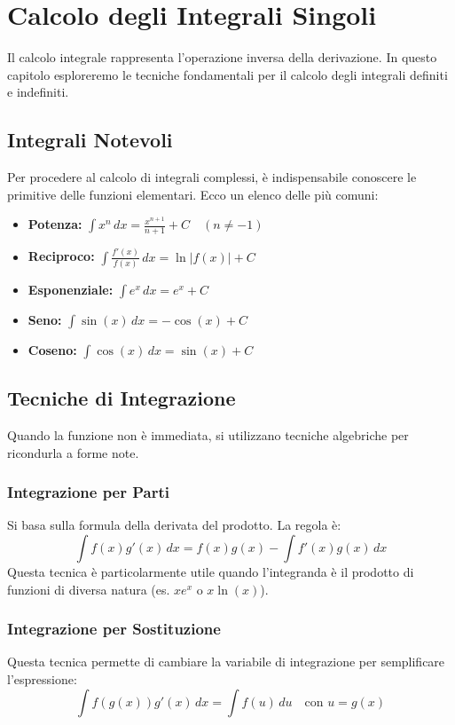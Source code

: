 \chapter{Calcolo degli Integrali Singoli}

Il calcolo integrale rappresenta l'operazione inversa della derivazione. In questo capitolo esploreremo le tecniche fondamentali per il calcolo degli integrali definiti e indefiniti.

\section{Integrali Notevoli}
Per procedere al calcolo di integrali complessi, è indispensabile conoscere le primitive delle funzioni elementari. Ecco un elenco delle più comuni:

\begin{itemize}
    \item \textbf{Potenza:} $\int x^n \, dx = \frac{x^{n+1}}{n+1} + C \quad (n \neq -1)$
    \item \textbf{Reciproco:} $\int \frac{f'(x)}{f(x)} \, dx = \ln|f(x)| + C$
    \item \textbf{Esponenziale:} $\int e^x \, dx = e^x + C$
    \item \textbf{Seno:} $\int \sin(x) \, dx = -\cos(x) + C$
    \item \textbf{Coseno:} $\int \cos(x) \, dx = \sin(x) + C$
\end{itemize}

\section{Tecniche di Integrazione}
Quando la funzione non è immediata, si utilizzano tecniche algebriche per ricondurla a forme note.

\subsection{Integrazione per Parti}
Si basa sulla formula della derivata del prodotto. La regola è:
\begin{equation}
    \int f(x)g'(x) \, dx = f(x)g(x) - \int f'(x)g(x) \, dx
\end{equation}
Questa tecnica è particolarmente utile quando l'integranda è il prodotto di funzioni di diversa natura (es. $x e^x$ o $x \ln(x)$).

\subsection{Integrazione per Sostituzione}
Questa tecnica permette di cambiare la variabile di integrazione per semplificare l'espressione:
\begin{equation}
    \int f(g(x))g'(x) \, dx = \int f(u) \, du \quad \text{con } u = g(x)
\end{equation}
